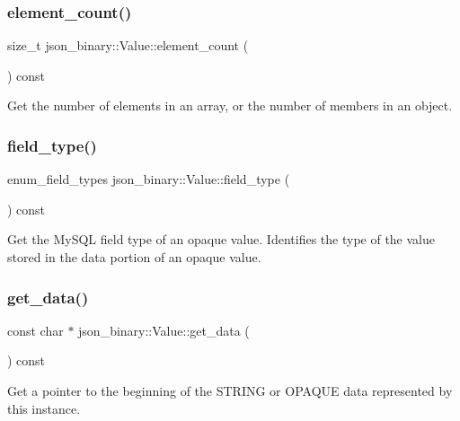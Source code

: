 \subsubsection{\texorpdfstring{element\+\_\+count()}{element\_count()}}
{\footnotesize\ttfamily size\+\_\+t json\+\_\+binary\+::\+Value\+::element\+\_\+count (\begin{DoxyParamCaption}{ }\end{DoxyParamCaption}) const}

Get the number of elements in an array, or the number of members in an object. \mbox{\label{classjson__binary_1_1Value_acd6727baec7b2a35aed4ea9683d7dfe9}} 
\subsubsection{\texorpdfstring{field\+\_\+type()}{field\_type()}}
{\footnotesize\ttfamily enum\+\_\+field\+\_\+types json\+\_\+binary\+::\+Value\+::field\+\_\+type (\begin{DoxyParamCaption}{ }\end{DoxyParamCaption}) const}

Get the My\+S\+QL field type of an opaque value. Identifies the type of the value stored in the data portion of an opaque value. \mbox{\label{classjson__binary_1_1Value_a8691a2514d0bdd2a1f5c39c87ccab132}} 
\subsubsection{\texorpdfstring{get\+\_\+data()}{get\_data()}}
{\footnotesize\ttfamily const char $\ast$ json\+\_\+binary\+::\+Value\+::get\+\_\+data (\begin{DoxyParamCaption}{ }\end{DoxyParamCaption}) const}

Get a pointer to the beginning of the S\+T\+R\+I\+NG or O\+P\+A\+Q\+UE data represented by this instance. \mbox{\label{classjson__binary_1_1Value_a89cd66f8f33d58a241999aa4446ebd72}} 
